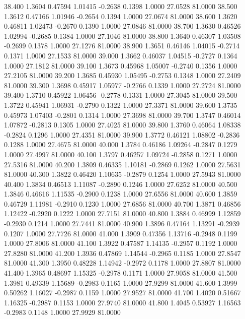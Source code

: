   38.400   1.3604   0.47594   1.01415  -0.2638   0.1398   1.0000  27.0528  81.0000
  38.500   1.3612   0.47166   1.01946  -0.2654   0.1394   1.0000  27.0674  81.0000
  38.600   1.3620   0.46811   1.02473  -0.2670   0.1390   1.0000  27.0846  81.0000
  38.700   1.3630   0.46526   1.02994  -0.2685   0.1384   1.0000  27.1046  81.0000
  38.800   1.3640   0.46307   1.03508  -0.2699   0.1378   1.0000  27.1276  81.0000
  38.900   1.3651   0.46146   1.04015  -0.2714   0.1371   1.0000  27.1533  81.0000
  39.000   1.3662   0.46037   1.04515  -0.2727   0.1364   1.0000  27.1812  81.0000
  39.100   1.3673   0.45968   1.05007  -0.2740   0.1356   1.0000  27.2105  81.0000
  39.200   1.3685   0.45930   1.05495  -0.2753   0.1348   1.0000  27.2409  81.0000
  39.300   1.3698   0.45917   1.05977  -0.2766   0.1339   1.0000  27.2724  81.0000
  39.400   1.3710   0.45922   1.06456  -0.2778   0.1331   1.0000  27.3045  81.0000
  39.500   1.3722   0.45941   1.06931  -0.2790   0.1322   1.0000  27.3371  81.0000
  39.600   1.3735   0.45973   1.07403  -0.2801   0.1314   1.0000  27.3698  81.0000
  39.700   1.3747   0.46014   1.07872  -0.2813   0.1305   1.0000  27.4025  81.0000
  39.800   1.3760   0.46064   1.08338  -0.2824   0.1296   1.0000  27.4351  81.0000
  39.900   1.3772   0.46121   1.08802  -0.2836   0.1288   1.0000  27.4675  81.0000
  40.000   1.3784   0.46186   1.09264  -0.2847   0.1279   1.0000  27.4997  81.0000
  40.100   1.3797   0.46257   1.09724  -0.2858   0.1271   1.0000  27.5316  81.0000
  40.200   1.3809   0.46335   1.10181  -0.2869   0.1262   1.0000  27.5631  81.0000
  40.300   1.3822   0.46420   1.10635  -0.2879   0.1254   1.0000  27.5943  81.0000
  40.400   1.3834   0.46513   1.11087  -0.2890   0.1246   1.0000  27.6252  81.0000
  40.500   1.3846   0.46616   1.11535  -0.2900   0.1238   1.0000  27.6556  81.0000
  40.600   1.3859   0.46729   1.11981  -0.2910   0.1230   1.0000  27.6856  81.0000
  40.700   1.3871   0.46856   1.12422  -0.2920   0.1222   1.0000  27.7151  81.0000
  40.800   1.3884   0.46999   1.12859  -0.2930   0.1214   1.0000  27.7441  81.0000
  40.900   1.3896   0.47164   1.13291  -0.2939   0.1207   1.0000  27.7726  81.0000
  41.000   1.3909   0.47356   1.13716  -0.2948   0.1199   1.0000  27.8006  81.0000
  41.100   1.3922   0.47587   1.14135  -0.2957   0.1192   1.0000  27.8280  81.0000
  41.200   1.3936   0.47869   1.14544  -0.2965   0.1185   1.0000  27.8547  81.0000
  41.300   1.3950   0.48228   1.14942  -0.2972   0.1178   1.0000  27.8807  81.0000
  41.400   1.3965   0.48697   1.15325  -0.2978   0.1171   1.0000  27.9058  81.0000
  41.500   1.3981   0.49339   1.15689  -0.2983   0.1165   1.0000  27.9299  81.0000
  41.600   1.3999   0.50262   1.16027  -0.2987   0.1159   1.0000  27.9527  81.0000
  41.700   1.4020   0.51667   1.16325  -0.2987   0.1153   1.0000  27.9740  81.0000
  41.800   1.4045   0.53927   1.16563  -0.2983   0.1148   1.0000  27.9929  81.0000
